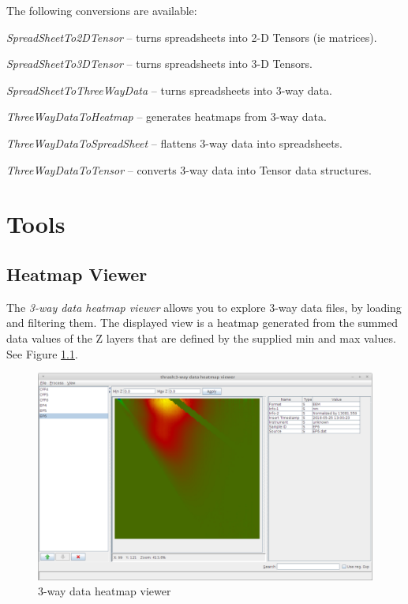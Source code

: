 \documentclass[a4paper]{book}
\begin{document}
\noindent The following conversions are available:
\begin{tight_itemize}
  \item \textit{SpreadSheetTo2DTensor} -- turns spreadsheets into 2-D Tensors (ie matrices).
  \item \textit{SpreadSheetTo3DTensor} -- turns spreadsheets into 3-D Tensors.
  \item \textit{SpreadSheetToThreeWayData} -- turns spreadsheets into 3-way data.
  \item \textit{ThreeWayDataToHeatmap} -- generates heatmaps from 3-way data.
  \item \textit{ThreeWayDataToSpreadSheet} -- flattens 3-way data into spreadsheets.
  \item \textit{ThreeWayDataToTensor} -- converts 3-way data into Tensor data structures.
\end{tight_itemize}

\chapter{Tools}
\section{Heatmap Viewer}
The \textit{3-way data heatmap viewer} allows you to explore 3-way data files,
by loading and filtering them. The displayed view is a heatmap generated from
the summed data values of the Z layers that are defined by the supplied min
and max values. See Figure \ref{heatmapviewer}.

\begin{figure}[htb]
  \centering
  \includegraphics[width=12.0cm]{images/heatmapviewer.png}
  \caption{3-way data heatmap viewer}
  \label{heatmapviewer}
\end{figure}


\end{document}
